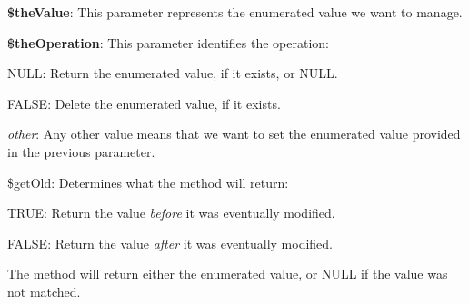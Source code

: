 \begin{DoxyItemize}
\item {\bfseries \$the\-Value}\-: This parameter represents the enumerated value we want to manage. 
\item {\bfseries \$the\-Operation}\-: This parameter identifies the operation\-: 
\begin{DoxyItemize}
\item {\ttfamily N\-U\-L\-L}\-: Return the enumerated value, if it exists, or {\ttfamily N\-U\-L\-L}. 
\item {\ttfamily F\-A\-L\-S\-E}\-: Delete the enumerated value, if it exists. 
\item {\itshape other}\-: Any other value means that we want to set the enumerated value provided in the previous parameter. 
\end{DoxyItemize}
\item {\ttfamily \$get\-Old}\-: Determines what the method will return\-: 
\begin{DoxyItemize}
\item {\ttfamily T\-R\-U\-E}\-: Return the value {\itshape before} it was eventually modified. 
\item {\ttfamily F\-A\-L\-S\-E}\-: Return the value {\itshape after} it was eventually modified. 
\end{DoxyItemize}
\end{DoxyItemize}

The method will return either the enumerated value, or {\ttfamily N\-U\-L\-L} if the value was not matched.


